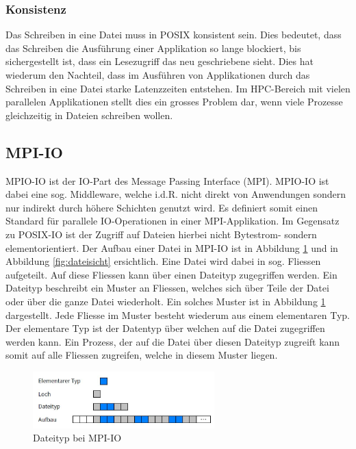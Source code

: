 \subsubsection{Konsistenz}
Das Schreiben in eine Datei muss in POSIX konsistent sein. Dies bedeutet, dass das Schreiben die Ausf\"uhrung einer Applikation so lange blockiert, bis sichergestellt ist, dass ein Lesezugriff das neu geschriebene sieht. Dies hat wiederum den Nachteil, dass im Ausführen von Applikationen durch das Schreiben in eine Datei starke Latenzzeiten entstehen. Im HPC-Bereich mit vielen parallelen Applikationen stellt dies ein grosses Problem dar, wenn viele Prozesse gleichzeitig in Dateien schreiben wollen.
\cite{Lockwood.11.09.2017}
\subsection{MPI-IO}
MPIO-IO ist der IO-Part des Message Passing Interface (MPI). MPIO-IO ist dabei eine sog. Middleware, welche i.d.R. nicht direkt von Anwendungen sondern nur indirekt durch h\"ohere Schichten genutzt wird. Es definiert somit einen Standard f\"ur parallele IO-Operationen in einer MPI-Applikation. Im Gegensatz zu POSIX-IO ist der Zugriff auf Dateien hierbei nicht Bytestrom- sondern elementorientiert. Der Aufbau einer Datei in MPI-IO ist in Abbildung \ref{fig:dateityp} und in Abbildung \ref{fig:dateisicht} ersichtlich. Eine Datei wird dabei in sog. Fliessen aufgeteilt. Auf diese Fliessen kann \"uber einen Dateityp zugegriffen werden. Ein Dateityp beschreibt ein Muster an Fliessen, welches sich \"uber Teile der Datei oder \"uber die ganze Datei wiederholt. Ein solches Muster ist in Abbildung \ref{fig:dateityp} dargestellt. Jede Fliesse im Muster besteht wiederum aus einem elementaren Typ. Der elementare Typ ist der Datentyp \"uber welchen auf die Datei zugegriffen werden kann. Ein Prozess, der auf die Datei \"uber diesen Dateityp zugreift kann somit auf alle Fliessen zugreifen, welche in diesem Muster liegen.


\begin{figure}[h]
	\centering
	\includegraphics[width=7cm]{fig/Dateityp.JPG}
	\caption{Dateityp bei MPI-IO \cite{Kuhn.13.05.2016}}
	\label{fig:dateityp}
\end{figure}

